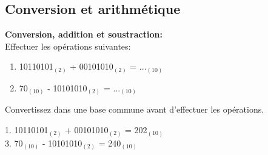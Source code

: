 \subsection{Conversion et arithmétique}
\begin{Exercice}[5 minutes] \textbf{Conversion, addition et soustraction:}\\
    Effectuer les opérations suivantes:
    \begin{enumerate}
        \item 10110101$_{(2)}$ + 00101010$_{(2)}$ = ...$_{(10)}$
        \item 70$_{(10)}$ - 10101010$_{(2)}$ = ...$_{(10)}$
    \end{enumerate}
        \begin{conseil}
        Convertissez dans une base commune avant d'effectuer les opérations.
    \end{conseil}
        
    \begin{solution}
        1. 10110101$_{(2)}$ + 00101010$_{(2)}$ = 202$_{(10)}$\\
        3. 70$_{(10)}$ - 10101010$_{(2)}$ = 240$_{(10)}$
    \end{solution}
\end{Exercice}


